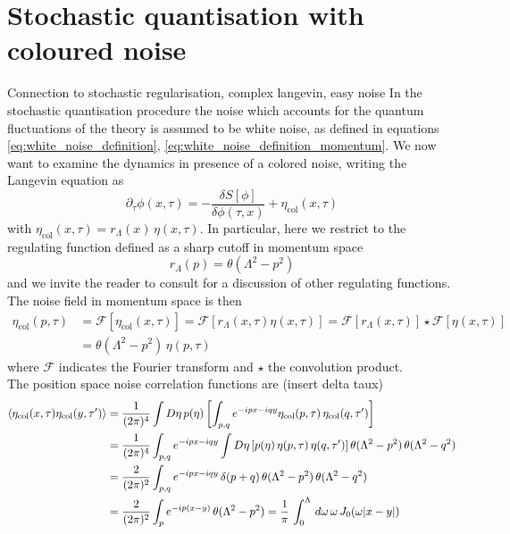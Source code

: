 \section{Stochastic quantisation with coloured noise}
\label{sec:coloured_noise}
Connection to stochastic regularisation, complex langevin, easy noise \cite{boo}
In the stochastic quantisation procedure the noise which accounts for the quantum fluctuations of the theory is assumed to be white noise, as defined in equations \eqref{eq:white_noise_definition}, \eqref{eq:white_noise_definition_momentum}. 
We now want to examine the dynamics in presence of a colored noise, writing the Langevin equation as
\begin{equation*}
    \partial_\tau \phi(x, \tau) = - \frac{\delta S[\phi]}{\delta \phi (\tau, x)} + \eta_\text{col}(x, \tau)
    \label{eq:Langevin_scalar_regularised}
\end{equation*}
with $\eta_\text{col}(x,\tau) = r_\Lambda(x) \, \eta(x,\tau)$. In particular, here we restrict to the regulating function defined as a sharp cutoff in momentum space
\begin{equation}
    r_\Lambda(p) = \theta(\Lambda^2 - p^2)
    \label{eq:regulator}
\end{equation}
and we invite the reader to consult \cite{Pawlowski2017CoolingNoise} for a discussion of other regulating functions. \\
The noise field in momentum space is then
\begin{equation*}
    \begin{aligned}
        \eta_\text{col}(p, \tau) &= \mathcal{F}[\eta_\text{col}(x,\tau)] = \mathcal{F}[r_\Lambda(x,\tau) \eta(x,\tau)] = \mathcal{F}[r_\Lambda(x,\tau)] \star \mathcal{F}[\eta(x,\tau)] \\
        &= \theta(\Lambda^2 - p^2)  \, \eta(p, \tau)
    \end{aligned}
\end{equation*}
where $\mathcal{F}$ indicates the Fourier transform and $\star$ the convolution product. \\
The position space noise correlation functions are (insert delta taux)
\begin{equation}
    \begin{aligned}
        \left\langle \eta_\text{col}(x,\tau)\eta_\text{col}(y,\tau') \right\rangle &= \frac{1}{(2\pi)^{4}} \int D\eta \, p(\eta) \left[\int_{p,q} e^{-ipx-iqy }\eta_\text{col}(p,\tau) \, \eta_\text{col}(q,\tau')\right] \\
        &= \frac{1}{(2\pi)^{4}} \int_{p,q} e^{-ipx-iqy } \int D\eta \left[ p(\eta) \, \eta(p,\tau) \, \eta(q,\tau') \right] \theta(\Lambda^2 - p^2) \, \theta(\Lambda^2 - q^2) \\
        &= \frac{2}{(2\pi)^{2}} \int_{p,q} e^{-ipx-iqy} \, \delta(p+q) \, \theta(\Lambda^2 - p^2) \, \theta(\Lambda^2 - q^2) \\
        &= \frac{2}{(2\pi)^{2}} \int_{p} e^{-ip(x-y)} \, \theta(\Lambda^2 - p^2) = \frac{1}{\pi} \, \int_0^\Lambda \, d\omega \, \omega \, J_0(\omega |x-y|)
    \end{aligned}
    \label{eq:colored_noise_correlation}
\end{equation}
